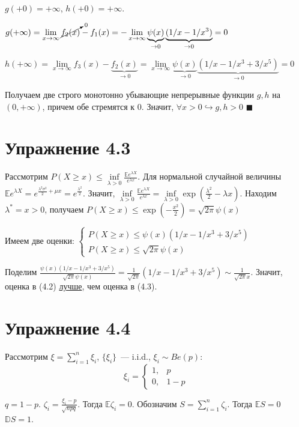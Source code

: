 \documentclass[a4paper]{article}
\begin{document}
$g(+0)=+\infty$, $h(+0)=+\infty$.

$g(+\infty)=\lim\limits_{x\to\infty}\cancelto{0}{f_2(x)}-f_1(x)=-\lim\limits_{x\to\infty}\underbrace{\psi(x)}_{\to 0}\underbrace{(1/x-1/x^3)}_{\to 0}=0$

$h(+\infty)=\lim\limits_{x\to\infty}f_3(x)-\underbrace{f_2(x)}_{\to 0}=\lim\limits_{x\to\infty}\underbrace{\psi(x)}_{\to 0}\underbrace{(1/x-1/x^3+3/x^5)}_{\to 0}=0$

Получаем две строго монотонно убывающие непрерывные функции $g,h$ на $(0,+\infty)$, причем обе стремятся к 0. Значит, $\forall x>0\hookrightarrow g,h>0$ $\blacksquare$

\section*{Упражнение 4.3}
Рассмотрим $P(X\geqslant x)\leqslant\inf\limits_{\lambda > 0}\frac{\mathbb{E}e^{\lambda X}}{e^{\lambda x}}$. Для нормальной случайной величины $\mathbb{E}e^{\lambda X}=e^{\frac{\lambda^2\sigma^2}{2}+\mu x}=e^{\frac{\lambda^2}{2}}$. Значит, $\inf\limits_{\lambda >0}\frac{\mathbb{E}e^{\lambda X}}{e^{\lambda x}}=\inf\limits_{\lambda >0}\exp(\frac{\lambda^2}{2}-\lambda x)$. Находим $\lambda^*=x>0$, получаем $P(X\geqslant x)\leqslant \exp(-\frac{x^2}{2})=\sqrt{2\pi}\psi(x)$

Имеем две оценки:
$\begin{cases}
P(X\geqslant x)\leqslant \psi(x)(1/x-1/x^3+3/x^5)\\
P(X\geqslant x)\leqslant \sqrt{2\pi}\psi(x)
\end{cases}$

Поделим $\frac{\psi(x)(1/x-1/x^3+3/x^5)}{\sqrt{2\pi}\psi(x)}=\frac{1}{\sqrt{2\pi}}(1/x-1/x^3+3/x^5)\sim\frac{1}{\sqrt{2\pi}x}$. Значит, оценка в (4.2) \underline{лучше}, чем оценка в (4.3).
\section*{Упражнение 4.4}
Рассмотрим $\xi=\sum\limits_{i=1}^n \xi_i$, $\{\xi_i\}$~--- i.i.d., $\xi_i\sim Be(p)$: $$\xi_i=\begin{cases}
1,&p\\
0,&1-p
\end{cases}$$

$q=1-p$. $\zeta_i=\frac{\xi_i-p}{\sqrt{npq}}$. Тогда $\mathbb{E}\zeta_i=0$. Обозначим $S=\sum\limits_{i=1}^n\zeta_i$. Тогда $\mathbb{E}S=0$ $\mathbb{D}S=1$.
\end{document}
